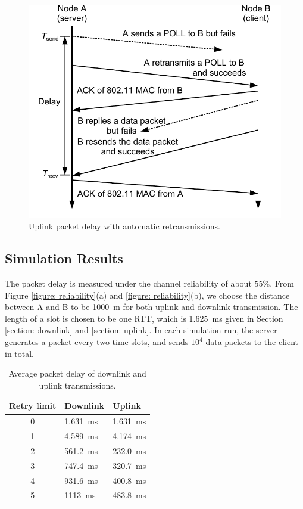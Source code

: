 \documentclass{article}
\begin{document}
\begin{figure}[htbp]
\centering
\includegraphics[scale = 0.7]{uplink_delay.pdf}
\caption{Uplink packet delay with automatic retransmissions.}
\label{figure: uplink delay}
\end{figure}

\subsection{Simulation Results}
The packet delay is measured under the channel reliability of about $55\%$. From Figure \ref{figure: reliability}(a) and \ref{figure: reliability}(b), we choose the distance between A and B to be \SI{1000}{m} for both uplink and downlink transmission. The length of a slot is chosen to be one RTT, which is \SI{1.625}{ms} given in Section \ref{section: downlink} and \ref{section: uplink}. In each simulation run, the server generates a packet every two time slots, and sends $10^4$ data packets to the client in total.

\begin{table}[tbp]
\centering
    \caption{Average packet delay of downlink and uplink transmissions.}
    \vspace{2mm}
    \begin{tabular}{ | c | l | l | }
    \hline
    Retry limit & Downlink & Uplink \\ \hline
    0& \SI{1.631}{ms} & \SI{1.631}{ms} \\ \hline
    1 & \SI{4.589}{ms}  & \SI{4.174}{ms} \\  \hline
    2 & \SI{561.2}{ms} & \SI{232.0}{ms} \\  \hline
    3 & \SI{747.4}{ms}  & \SI{320.7}{ms} \\  \hline
    4 & \SI{931.6}{ms}  & \SI{400.8}{ms} \\  \hline
    5 &  \SI{1113}{ms} & \SI{483.8}{ms} \\ 
    \hline
\end{tabular}
\label{table: average delay}
\end{table}
\end{document}
